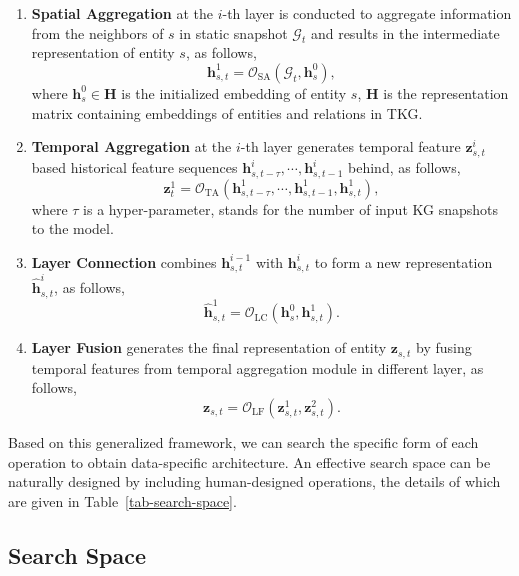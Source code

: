 \documentclass[11pt]{article}
\begin{document}
\begin{enumerate}[leftmargin=*]
	\item \textbf{Spatial Aggregation} at the $i$-th layer is conducted to 
	aggregate information from the neighbors of $s$ in static snapshot $\mathcal{G}_t$ 
	and results in the intermediate representation of entity $s$, as follows,
	\begin{equation}
		\mathbf{h}_{s,t}^1=\mathcal{O}_\text{SA}(\mathcal{G}_t,\mathbf{h}_{s}^0),
	\end{equation}
	where $\mathbf{h}_{s}^0\in\mathbf{H}$ is the initialized embedding of entity $s$, 
	$\mathbf{H}$ is the representation matrix containing embeddings of entities and relations in TKG. 

	\item \textbf{Temporal Aggregation} at the $i$-th layer generates temporal feature
	$\mathbf{z}_{s,t}^i$
	based historical feature sequences 
	$\mathbf{h}_{s,t-\tau}^i,\cdots, \mathbf{h}_{s,t-1}^i$ behind, as follows,
	\begin{equation}
		\mathbf{z}_{t}^1=\mathcal{O}_\text{TA}(\mathbf{h}_{s,t-\tau}^1,\cdots, \mathbf{h}_{s,t-1}^1, \mathbf{h}_{s,t}^1),
	\end{equation}
	where $\tau$ is a hyper-parameter, stands for the number of input KG snapshots to the model. 
	\item \textbf{Layer Connection} combines $\mathbf{h}_{s,t}^{i-1}$ with $\mathbf{h}_{s,t}^i$ to form a new representation $\hat{\mathbf{h}}_{s,t}^i$, as follows,
	\begin{equation}
		\hat{\mathbf{h}}_{s,t}^1=\mathcal{O}_\text{LC}(\mathbf{h}_{s}^0,\mathbf{h}_{s,t}^1).
	\end{equation}
	\item \textbf{Layer Fusion} generates the final representation of entity
	$\mathbf{z}_{s,t}$ 
	by fusing temporal features from temporal aggregation module in different layer, as follows,
	\begin{equation}
		\mathbf{z}_{s,t}=\mathcal{O}_\text{LF}(\mathbf{z}_{s,t}^1,\mathbf{z}_{s,t}^2).
	\end{equation}
\end{enumerate}

Based on this generalized framework, 
we can search the specific form of each operation 
to obtain data-specific architecture.
An effective search space can be naturally designed by 
including human-designed operations, 
the details of which are given in Table~\ref{tab-search-space}.

\subsection{Search Space}\label{sec-search-space}
\end{document}
